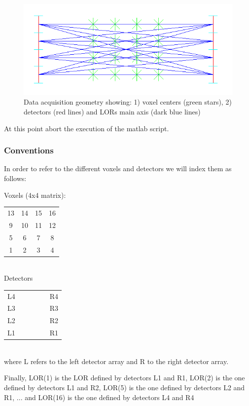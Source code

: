 \documentclass[12pt]{article} %
\begin{document}
\begin{figure}
\includegraphics{images/geometry.png}
\caption{Data acquisition geometry showing: 1) voxel centers (green stars), 2) detectors (red lines) and LORs main axis (dark blue lines) \label{fig:geometry}}
\end{figure}

At this point abort the execution of the matlab script.

\subsubsection{Conventions}

In order to refer to the different voxels and detectors we will index them as follows:

Voxels (4x4 matrix):

\begin{tabular}{ c c c c }
 13 & 14 & 15 & 16\\
 9 & 10 & 11 & 12\\
 5 & 6 & 7 & 8 \\
 1 & 2 & 3 & 4 \\
\end{tabular}\\

Detectors

\begin{tabular}{ l  c  c  c  c  r}
 L4 &  &  &  &  & R4\\
 L3 &  &  &  &  & R3\\
 L2 &  &  &  &  & R2\\
 L1 &  &  &  &  & R1\\
\end{tabular}\\
where L refers to the left detector array and R to the right detector array.

Finally, LOR(1) is the LOR defined by detectors L1 and R1, LOR(2) is the one defined by detectors L1 and R2, LOR(5) is the one defined by detectors L2 and R1, ... and LOR(16) is the one defined by detectors L4 and R4
\end{document}
